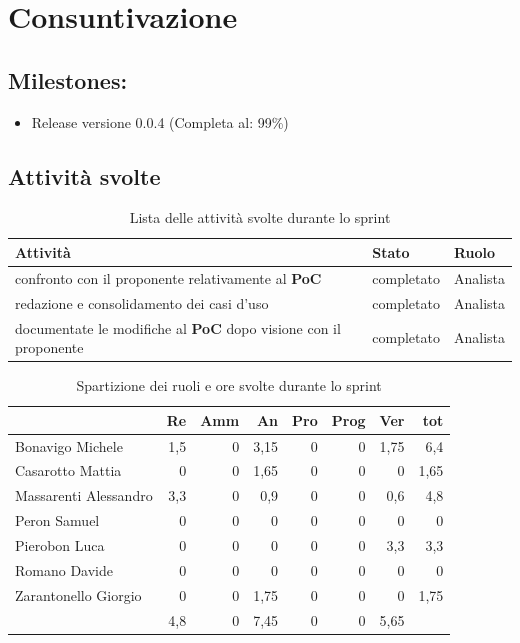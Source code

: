 \section{Consuntivazione}

\subsection{Milestones:}
\begin{itemize}
    \item Release versione 0.0.4 (Completa al: 99\%)
\end{itemize}

\subsection{Attività svolte}

\begin{table}[ht]
    \begin{tabularx}{\textwidth}{X l l}
        
        \rowcolor{gray!30} \textbf{Attività} & \textbf{Stato} & \textbf{Ruolo}\\
        
        \hline
        confronto con il proponente relativamente al \textbf{PoC} & completato & Analista \\
        redazione e consolidamento dei casi d'uso & completato & Analista \\
        documentate le modifiche al \textbf{PoC} dopo visione con il proponente & completato & Analista \\
        \end{tabularx}
    \caption{Lista delle attività svolte durante lo sprint}
\end{table}


\begin{table}[ht]
    \begin{tabularx}{\linewidth}{X|rrrrrrr}
    \rowcolor{gray!30}& Re & Amm & An & Pro & Prog & Ver & tot \\
    \hline
    Bonavigo Michele                        & 1,5 & 0 & 3,15 & 0 & 0 & 1,75  & 6,4 \\
    \rowcolor{gray!10}Casarotto Mattia      & 0 & 0 & 1,65 & 0 & 0 & 0 & 1,65 \\
    Massarenti Alessandro                   & 3,3 & 0 & 0,9 & 0 & 0 & 0,6  & 4,8 \\
    \rowcolor{gray!10}Peron Samuel          & 0 & 0 & 0 & 0 & 0 & 0 & 0 \\
    Pierobon Luca                           & 0 & 0 & 0 & 0 & 0 & 3,3 & 3,3 \\
    \rowcolor{gray!10}Romano Davide         & 0 & 0 & 0 & 0 & 0 & 0 & 0 \\
    Zarantonello Giorgio                    & 0 & 0 & 1,75 & 0 & 0 & 0 & 1,75 \\
    \hline                                  & 4,8 & 0 & 7,45 & 0 & 0 & 5,65 & \\
    \end{tabularx}
    \caption{\label{ruoli-persone}Spartizione dei ruoli e ore svolte durante lo sprint}
\end{table}


